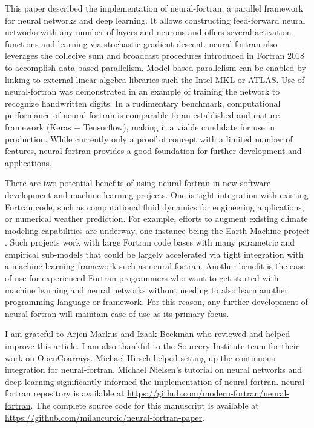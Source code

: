 \documentclass[sigplan, review=false, screen=true, balance=true]{acmart}
\begin{document}
This paper described the implementation of neural-fortran, a parallel framework
for neural networks and deep learning. It allows constructing feed-forward
neural networks with any number of layers and neurons and offers several
activation functions and learning via stochastic gradient descent.
neural-fortran also leverages the collecive sum and broadcast procedures
introduced in Fortran 2018 to accomplish data-based parallelism.
Model-based parallelism can be enabled by linking to external linear algebra
libraries such the Intel MKL or ATLAS. Use of neural-fortran was demonstrated
in an example of training the network to recognize handwritten digits.
In a rudimentary benchmark, computational performance of neural-fortran is
comparable to an established and mature framework (Keras + Tensorflow),
making it a viable candidate for use in production.
While currently only a proof of concept with a limited number of features,
neural-fortran provides a good foundation for further development and
applications.

There are two potential benefits of using neural-fortran in new
software development and machine learning projects.
One is tight integration with existing Fortran code, such as computational
fluid dynamics for engineering applications, or numerical weather prediction.
For example, efforts to augment existing climate modeling capabilities are underway,
one instance being the Earth Machine project \citep{schneider17, voosen18}.
Such projects work with large Fortran code bases with many parametric and
empirical sub-models that could be largely accelerated via tight integration
with a machine learning framework such as neural-fortran.
Another benefit is the ease of use for experienced Fortran programmers who
want to get started with machine learning and neural networks without needing
to also learn another programming language or framework. For this reason, any
further development of neural-fortran will maintain ease of use as its primary
focus.

\begin{acks}
I am grateful to Arjen Markus and Izaak Beekman who reviewed and helped improve this article.
I am also thankful to the Sourcery Institute team for their work on OpenCoarrays. 
Michael Hirsch helped setting up the continuous integration for neural-fortran. 
Michael Nielsen's tutorial on neural networks and deep learning
significantly informed the implementation of neural-fortran.
neural-fortran repository is available at
\url{https://github.com/modern-fortran/neural-fortran}.
The complete source code for this manuscript is available at
\url{https://github.com/milancurcic/neural-fortran-paper}.
\end{acks}



\end{document}
